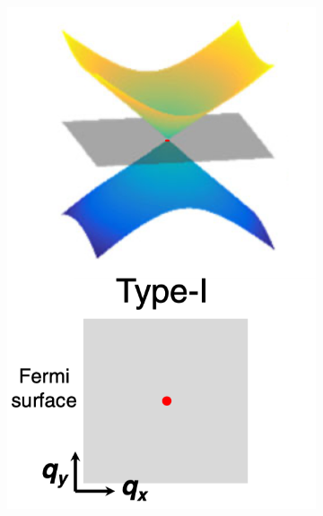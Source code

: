     \begin{figure}[H]
        \centering
        \begin{subfigure}[b]{0.2\linewidth}
            \includegraphics[width = \linewidth]{fig/Chap 2/Type I .png}
            \caption{}
            \label{2fig:type1}
        \end{subfigure}
        \begin{subfigure}[b]{0.2\linewidth}

\end{subfigure}
\end{figure}
